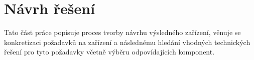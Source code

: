 \chapter{Návrh řešení}

Tato část práce popisuje proces tvorby návrhu výsledného zařízení, věnuje se konkretizaci požadavků na zařízení a následnému hledání vhodných technických řešení pro tyto požadavky včetně výběru odpovídajících komponent.















